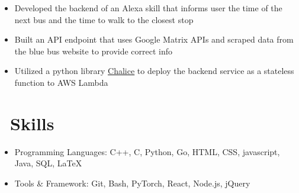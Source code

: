 \documentclass{resume}
\begin{document}
\begin{itemize}
	\item Developed the backend of an Alexa skill that informs user the time of the next bus and the time to walk to the closest stop 
	\item Built an API endpoint that uses Google Matrix APIs and scraped data from the blue bus website to provide correct info
	\item Utilized a python library \href{https://github.com/aws/chalice}{\underline{Chalice}} to deploy the backend service as a stateless function to AWS Lambda
\end{itemize}
\vspace{-1.5ex}


\section{\faCogs\ Skills}
\begin{itemize}[parsep=0.5ex]
  \item Programming Languages: C++, C, Python, Go, HTML, CSS, javascript, Java, SQL, \LaTeX
  \item Tools \& Framework: Git, Bash, PyTorch, React, Node.js, jQuery
\end{itemize}
\end{document}
